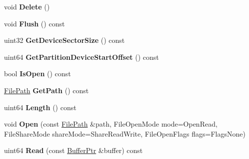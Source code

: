 \begin{DoxyCompactItemize}
\item 
\mbox{\label{class_gost_crypt_1_1_file_ae0cc3e9c69b23befa61996e296b4b3a2}} 
void {\bfseries Delete} ()
\item 
\mbox{\label{class_gost_crypt_1_1_file_a62c38718322d8161f20b73ae86e4ad25}} 
void {\bfseries Flush} () const
\item 
\mbox{\label{class_gost_crypt_1_1_file_a2b5150e9bdcadb9fcaa3e42c719f002a}} 
uint32 {\bfseries Get\+Device\+Sector\+Size} () const
\item 
\mbox{\label{class_gost_crypt_1_1_file_a323fbf04c4da7ba9785860fa47541fd8}} 
uint64 {\bfseries Get\+Partition\+Device\+Start\+Offset} () const
\item 
\mbox{\label{class_gost_crypt_1_1_file_ad740798367523ac53efecf0ff2855f36}} 
bool {\bfseries Is\+Open} () const
\item 
\mbox{\label{class_gost_crypt_1_1_file_a580ffa2267933dfd9b73841c58b3fc8d}} 
\hyperlink{class_gost_crypt_1_1_filesystem_path}{File\+Path} {\bfseries Get\+Path} () const
\item 
\mbox{\label{class_gost_crypt_1_1_file_a57efb915cfd1e01a153ced98946640f1}} 
uint64 {\bfseries Length} () const
\item 
\mbox{\label{class_gost_crypt_1_1_file_a5c89f93a13632f1f0ad5aadbfd842c14}} 
void {\bfseries Open} (const \hyperlink{class_gost_crypt_1_1_filesystem_path}{File\+Path} \&path, File\+Open\+Mode mode=Open\+Read, File\+Share\+Mode share\+Mode=Share\+Read\+Write, File\+Open\+Flags flags=Flags\+None)
\item 
\mbox{\label{class_gost_crypt_1_1_file_a0ebaad9651973586316b663c069beb86}} 
uint64 {\bfseries Read} (const \hyperlink{class_gost_crypt_1_1_buffer_ptr}{Buffer\+Ptr} \&buffer) const
\item 
\mbox{\label{class_gost_crypt_1_1_file_a4b373526122bd0578bd6a53bcb7e889b}} 

\end{DoxyCompactItemize}
